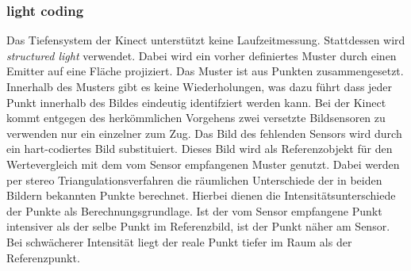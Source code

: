 			\subsubsection{light coding}
			Das Tiefensystem der Kinect unterstützt keine Laufzeitmessung. Stattdessen wird \textit{structured light} verwendet. Dabei wird ein vorher definiertes Muster durch einen Emitter auf eine Fläche projiziert. Das Muster ist aus Punkten zusammengesetzt. Innerhalb des Musters gibt es keine Wiederholungen, was dazu führt dass jeder Punkt innerhalb des Bildes eindeutig identifziert werden kann. Bei der Kinect kommt entgegen des herkömmlichen Vorgehens zwei versetzte Bildsensoren zu verwenden nur ein einzelner zum Zug. Das Bild des fehlenden Sensors wird durch ein hart-codiertes Bild substituiert. Dieses Bild wird als Referenzobjekt für den Wertevergleich mit dem vom Sensor empfangenen Muster genutzt. Dabei werden per stereo Triangulationsverfahren die räumlichen Unterschiede der in beiden Bildern bekannten Punkte berechnet. Hierbei dienen die Intensitätsunterschiede der Punkte als Berechnungsgrundlage. Ist der vom Sensor empfangene Punkt intensiver als der selbe Punkt im Referenzbild, ist der Punkt näher am Sensor. Bei schwächerer Intensität liegt der reale Punkt tiefer im Raum als der Referenzpunkt.\\
			\cite{kinect-georg}
			\cite{alpha-centauri-ueberlicht}
			\cite{kinect-uug-chem}
			
